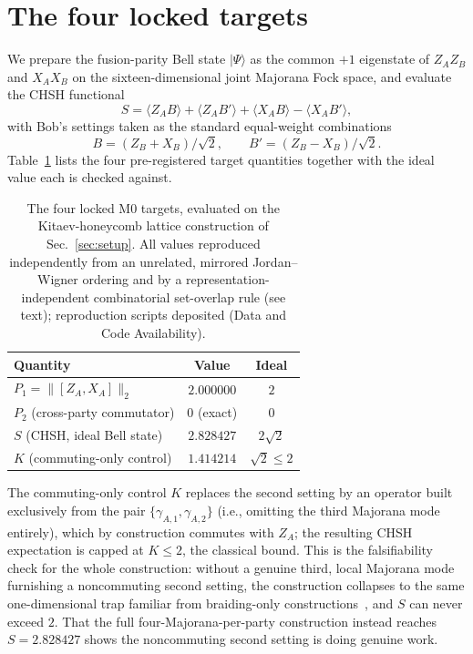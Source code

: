 \documentclass[aps,pra,twocolumn,superscriptaddress,floatfix,nofootinbib]{revtex4-2}
\providecommand{\ket}[1]{\lvert #1 \rangle}
\begin{document}
\section{The four locked targets}
\label{sec:m0}

We prepare the fusion-parity Bell state $\ket{\Psi}$ as the common
$+1$ eigenstate of $Z_AZ_B$ and $X_AX_B$ on the sixteen-dimensional
joint Majorana Fock space, and evaluate the CHSH functional
\begin{equation}
\label{eq:chsh}
S = \langle Z_A B\rangle + \langle Z_A B'\rangle
  + \langle X_A B\rangle - \langle X_A B'\rangle,
\end{equation}
with Bob's settings taken as the standard equal-weight combinations
\begin{equation}
\label{eq:settings}
B=(Z_B+X_B)/\sqrt2, \qquad B'=(Z_B-X_B)/\sqrt2 .
\end{equation}
Table~\ref{tab:m0} lists
the four pre-registered target quantities together with the ideal
value each is checked against.

\begin{table}[!h]
\centering
\caption{The four locked M0 targets, evaluated on the Kitaev-honeycomb
lattice construction of Sec.~\ref{sec:setup}. All values reproduced
independently from an unrelated, mirrored Jordan--Wigner ordering and
by a representation-independent combinatorial set-overlap rule (see
text); reproduction scripts deposited (Data and Code Availability).}
\label{tab:m0}
\begin{tabular}{lcc}
\toprule
Quantity & Value & Ideal \\
\midrule
$P_1=\lVert[Z_A,X_A]\rVert_2$        & $2.000000$ & $2$ \\
$P_2$ (cross-party commutator)       & $0$ (exact) & $0$ \\
$S$ (CHSH, ideal Bell state)         & $2.828427$ & $2\sqrt2$ \\
$K$ (commuting-only control)         & $1.414214$ & $\sqrt2\le2$ \\
\bottomrule
\end{tabular}
\end{table}

The commuting-only control $K$ replaces the second setting by an
operator built exclusively from the pair $\{\gamma_{A,1},\gamma_{A,2}\}$
(i.e., omitting the third Majorana mode entirely), which by
construction commutes with $Z_A$; the resulting CHSH expectation is
capped at $K\le2$, the classical bound. This is the falsifiability
check for the whole construction: without a genuine third, local
Majorana mode furnishing a noncommuting second setting, the
construction collapses to the same one-dimensional trap familiar from
braiding-only constructions~\cite{Brennen2009}, and $S$ can never
exceed $2$. That the full four-Majorana-per-party construction instead
reaches $S=2.828427$ shows the noncommuting second setting is doing
genuine work.
\end{document}
